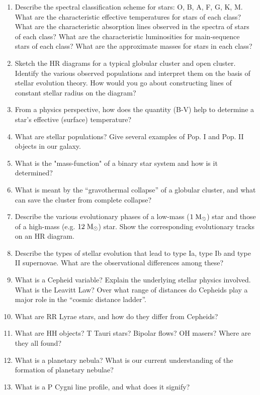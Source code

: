 \documentclass[10pt, oneside]{book}
\begin{document}
\begin{enumerate}[start=16]
    \item Describe the spectral classification scheme for stars: O, B, A, F, G, K, M. What are the characteristic effective temperatures for stars of each class? What are the characteristic absorption lines observed in the spectra of stars of each class? What are the characteristic luminosities for main-sequence stars of each class? What are the approximate masses for stars in each class?
    \item Sketch the HR diagrams for a typical globular cluster and open cluster. Identify the various observed populations and interpret them on the basis of stellar evolution theory. How would you go about constructing lines of constant stellar radius on the diagram?
    \item From a physics perspective, how does the quantity (B-V) help to determine a star's effective (surface) temperature?
    \item What are stellar populations? Give several examples of Pop. I and Pop. II objects in our galaxy.
    \item What is the "mass-function" of a binary star system and how is it determined?
    \item What is meant by the ``gravothermal collapse'' of a globular cluster, and what can save the cluster from complete collapse?
    \item Describe the various evolutionary phases of a low-mass ($1 \; {\rm M_{\odot}}$) star and those of a high-mass (e.g. $12 \; {\rm M_{\odot}}$) star. Show the corresponding evolutionary tracks on an HR diagram.
    \item Describe the types of stellar evolution that lead to type Ia, type Ib and type II supernovae. What are the observational differences among these?
    \item What is a Cepheid variable? Explain the underlying stellar physics involved. What is the Leavitt Law? Over what range of distances do Cepheids play a major role in the ``cosmic distance ladder''.
    \item What are RR Lyrae stars, and how do they differ from Cepheids?
    \item What are HH objects? T Tauri stars? Bipolar flows? OH masers? Where are they all found?
    \item What is a planetary nebula? What is our current understanding of the formation of planetary nebulae?
    \item What is a P Cygni line profile, and what does it signify?

\end{enumerate}
\end{document}
